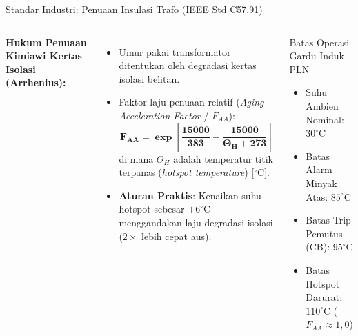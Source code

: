 \documentclass[aspectratio=169,10pt]{beamer}
\begin{document}
\begin{frame}{Standar Industri: Penuaan Insulasi Trafo (IEEE Std C57.91)}
  \begin{columns}[c]
    \textbf{Hukum Penuaan Kimiawi Kertas Isolasi (Arrhenius):}
    \begin{itemize}
      \item Umur pakai transformator ditentukan oleh degradasi kertas isolasi belitan.
      \item Faktor laju penuaan relatif (\textit{Aging Acceleration Factor} / $F_{AA}$):
      \begin{equation*}
        \mathbf{F_{AA} = \exp\left[ \frac{15000}{383} - \frac{15000}{\Theta_H + 273} \right]}
      \end{equation*}
      di mana $\Theta_H$ adalah temperatur titik terpanas (\textit{hotspot temperature}) [$^\circ$C].
      \item \textbf{Aturan Praktis}: Kenaikan suhu hotspot sebesar $+6^\circ\text{C}$ menggandakan laju degradasi isolasi ($2\times$ lebih cepat aus).
    \end{itemize}

    \begin{alertblock}{Batas Operasi Gardu Induk PLN}
      \begin{itemize}
        \item Suhu Ambien Nominal: $30^\circ\text{C}$
        \item Batas Alarm Minyak Atas: $85^\circ\text{C}$
        \item Batas Trip Pemutus (CB): $95^\circ\text{C}$
        \item Batas Hotspot Darurat: $110^\circ\text{C}$ ($F_{AA} \approx 1{,}0$)
      \end{itemize}
    \end{alertblock}
  \end{columns}
\end{frame}
\end{document}
